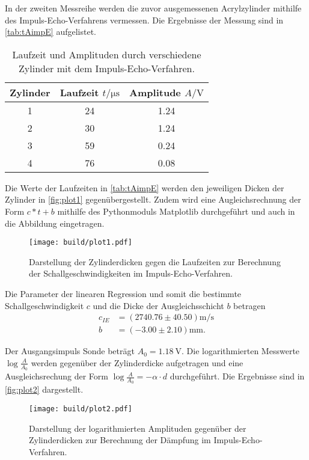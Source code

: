 In der zweiten Messreihe werden die zuvor ausgemessenen Acrylzylinder mithilfe des Impuls-Echo-Verfahrens vermessen.
Die Ergebnisse der Messung sind in \autoref{tab:tAimpE} aufgelistet.
\begin{table}[H]
  \centering
  \caption{Laufzeit und Amplituden durch verschiedene Zylinder mit dem Impuls-Echo-Verfahren.}
  \label{tab:tAimpE}
  \begin{tabular}{S[table-format=1.0] S[table-format=2.0] S[table-format=1.2] }
  \toprule
  {Zylinder} & {Laufzeit $t / \si{\micro\second}$} &  {Amplitude $A / \si{\volt}$}\\
   &  24  & 1.24  \\
  2 &  30  & 1.24  \\
  3 &  59  & 0.24  \\
  4 &  76  & 0.08  \\
  \bottomrule
  \end{tabular}
\end{table}
Die Werte der Laufzeiten in \autoref{tab:tAimpE} werden den jeweiligen Dicken der Zylinder in \autoref{fig:plot1} gegenübergestellt.
Zudem wird eine Augleichsrechnung der Form $c*t+b$ mithilfe des Pythonmoduls Matplotlib \cite{matplotlib} durchgeführt und auch in die 
Abbildung eingetragen.
\begin{figure}[H]
  \centering
  \texttt{[image: build/plot1.pdf]}
  \caption {Darstellung der Zylinderdicken gegen die Laufzeiten zur Berechnung der Schallgeschwindigkeiten im Impuls-Echo-Verfahren.}
  \label{fig:plot1}
\end{figure}
Die Parameter der linearen Regression und somit die bestimmte Schallgeschwindigkeit $c$ und die Dicke der Ausgleichsschicht $b$ betragen
\begin{align*}
  c_{IE}& =( 2740.76\pm 40.50 ) \si{\meter\per\second}\\
  b &= (-3.00\pm 2.10) \si{\milli\meter}.
\end{align*}

Der Ausgangsimpuls Sonde beträgt $A_0= \qty{1.18}{\volt}$.
Die logarithmierten Messwerte $\log{\frac{A}{A_0}}$ werden gegenüber der Zylinderdicke aufgetragen und eine 
Ausgleichsrechung der Form $\log{\frac{A}{A_0}}= -\alpha \cdot d$ durchgeführt. Die Ergebnisse sind in \autoref{fig:plot2} dargestellt.
\begin{figure}[H]
  \centering
  \texttt{[image: build/plot2.pdf]}
  \caption {Darstellung der logarithmierten Amplituden gegenüber der Zylinderdicken zur Berechnung der Dämpfung im Impuls-Echo-Verfahren.}
  \label{fig:plot2}
\end{figure}

